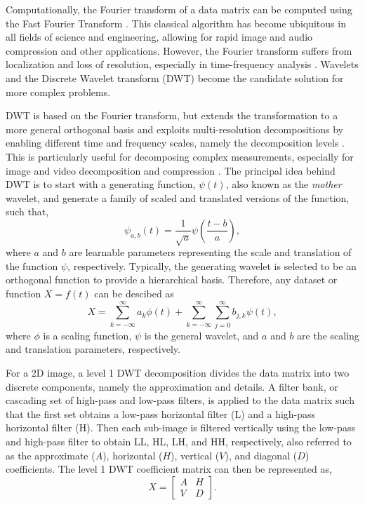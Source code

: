 \documentclass[a4paper,fleqn,12pt]{article}
\begin{document}
Computationally, the Fourier transform of a data matrix can be computed using the Fast Fourier Transform \cite{cooley1969fast, nussbaumer1982fast}. This classical algorithm has become ubiquitous in all fields of science and engineering, allowing for rapid image and audio compression and other applications. However, the Fourier transform suffers from localization and loss of resolution, especially in time-frequency analysis \cite{susrutha2019analysis}. Wavelets and the Discrete Wavelet transform (DWT) become the candidate solution for more complex problems.

DWT is based on the Fourier transform, but extends the transformation to a more general orthogonal basis and exploits multi-resolution decompositions by enabling different time and frequency scales, namely the decomposition levels \cite{heil1989continuous, edwards1991discrete}. This is particularly useful for decomposing complex measurements, especially for image and video decomposition and compression \cite{othman2020applications}. The principal idea behind DWT is to start with a generating function, $\psi(t)$, also known as the \emph{mother} wavelet, and generate a family of scaled and translated versions of the function, such that,
\begin{equation}
    \psi_{a,b}(t) = \frac{1}{\sqrt a}\psi(\frac{t-b}{a}),
\end{equation}
where $a$ and $b$ are learnable parameters representing the scale and translation of the function $\psi$, respectively. Typically, the generating wavelet is selected to be an orthogonal function to provide a hierarchical basis. Therefore, any dataset or function $X=f(t)$ can be descibed as 
\begin{equation}
    X = \sum_{k=-\infty}^{\infty}a_k\phi(t) + \sum_{k=-\infty}^{\infty}\sum_{j=0}^{\infty}b_{j,k}\psi(t) ,
\end{equation}
where $\phi$ is a scaling function, $\psi$ is the general wavelet, and $a$ and $b$ are the scaling and translation parameters, respectively.

For a 2D image, a level 1 DWT decomposition divides the data matrix into two discrete components, namely the approximation and details. A filter bank, or cascading set of high-pass and low-pass filters, is applied to the data matrix such that the first set obtains a low-pass horizontal filter (L) and a high-pass horizontal filter (H). Then each sub-image is filtered vertically using the low-pass and high-pass filter to obtain LL, HL, LH, and HH, respectively, also referred to as the approximate ($A$), horizontal ($H$), vertical ($V$), and diagonal ($D$) coefficients. The level 1 DWT coefficient matrix can then be represented as,
\begin{equation}\label{eq:dwt-matrix}
    X = \left[\begin{array}{cccc} A & H \\ V & D \end{array}\right] .
\end{equation}
\end{document}
